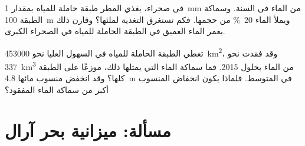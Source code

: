 \begin{exercise}[$\star\star\star$]\label{exo:g10:freshwater-resources:14}
في صحراء، يغذي المطر طبقة حاملة للمياه بمقدار \qty{1}{mm} من الماء في السنة.
وسماكة الطبقة \qty{100}{m} ويملأ الماء \qty{20}{\percent} من
حجمها. فكم تستغرق التغذية لملئها؟ وقارن ذلك بعمر
الماء العميق في الطبقة الحاملة للمياه في الصحراء الكبرى.
\end{exercise}

\begin{exercise}[$\star\star\star$]\label{exo:g10:freshwater-resources:15}
تغطي الطبقة الحاملة للمياه في السهول العليا نحو \qty{453000}{km^2}، وقد فقدت نحو
\qty{337}{km^3} من الماء بحلول 2015. فما سماكة الماء التي يمثلها ذلك، موزعًا على
الطبقة كلها؟ وقد انخفض منسوب مائها \qty{4.8}{m} في المتوسط.
فلماذا يكون انخفاض المنسوب أكبر من سماكة الماء المفقود؟
\end{exercise}

\section{مسألة: ميزانية بحر آرال}

